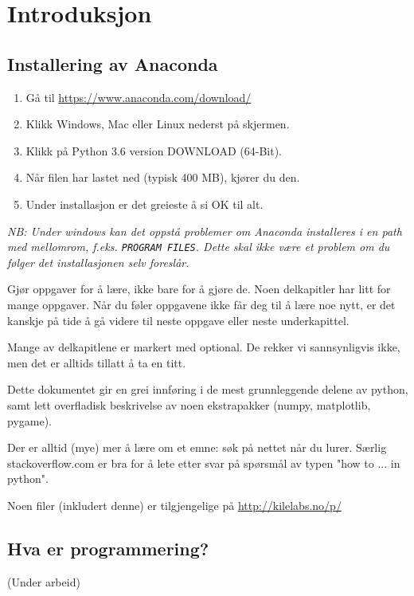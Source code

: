 \chapter{Introduksjon}
\section{Installering av Anaconda}
\begin{enumerate}
\item Gå til \url{https://www.anaconda.com/download/}
\item Klikk Windows, Mac eller Linux nederst på skjermen.
\item Klikk på Python 3.6 version  DOWNLOAD  (64-Bit).
\item Når filen har lastet ned (typisk 400 MB), kjører du den.
\item Under installasjon er det greieste å si OK til alt.
\end{enumerate}
{\em NB: Under windows kan det oppstå problemer om Anaconda installeres i en path med mellomrom, f.eks. \texttt{PROGRAM FILES}. Dette skal ikke være et problem om du følger det installasjonen selv foreslår.}

Gjør oppgaver for å lære, ikke bare for å gjøre de. Noen delkapitler har litt for mange oppgaver. Når du føler oppgavene ikke får deg til å lære noe nytt, er det kanskje på tide å gå videre til neste oppgave eller neste underkapittel. 

Mange av delkapitlene er markert med optional. De rekker vi sannsynligvis ikke, men det er alltids tillatt å ta en titt. 

Dette dokumentet gir en grei innføring i de mest grunnleggende delene av python,  samt lett overfladisk beskrivelse av noen ekstrapakker (numpy, matplotlib, pygame). 

Der er alltid (mye) mer å lære om et emne: søk på nettet når du lurer. Særlig stackoverflow.com er bra for å lete etter svar på spørsmål av typen "how to ... in python". 

Noen filer (inkludert denne) er tilgjengelige på \url{http://kilelabs.no/p/}


\section{Hva er programmering?}
(Under arbeid)